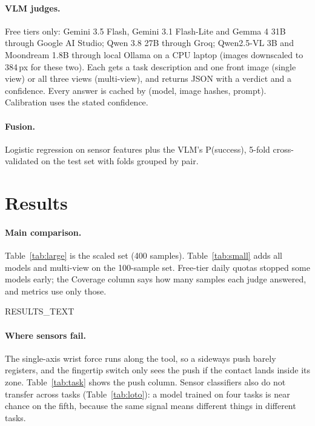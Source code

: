 \documentclass[10pt,twocolumn]{article}
\begin{document}
\paragraph{VLM judges.} Free tiers only: Gemini 3.5 Flash, Gemini 3.1 Flash-Lite and Gemma 4 31B through Google AI Studio; Qwen 3.8 27B through Groq; Qwen2.5-VL 3B and Moondream 1.8B through local Ollama on a CPU laptop (images downscaled to 384\,px for these two). Each gets a task description and one front image (single view) or all three views (multi-view), and returns JSON with a verdict and a confidence. Every answer is cached by (model, image hashes, prompt). Calibration uses the stated confidence.
\paragraph{Fusion.} Logistic regression on sensor features plus the VLM's P(success), 5-fold cross-validated on the test set with folds grouped by pair.

\section{Results}
\paragraph{Main comparison.} Table~\ref{tab:large} is the scaled set (400 samples). Table~\ref{tab:small} adds all models and multi-view on the 100-sample set. Free-tier daily quotas stopped some models early; the Coverage column says how many samples each judge answered, and metrics use only those.
\begin{table}[t]\centering\small\caption{Scaled set (400 samples). Sorted by balanced accuracy.}\label{tab:large}\end{table}
\begin{table}[t]\centering\small\caption{Small set (100 samples), all judges including multi-view. Partial coverage reflects free-tier quotas.}\label{tab:small}\end{table}
\begin{table}[t]\centering\small\resizebox{\columnwidth}{!}{}\caption{Balanced accuracy by task, scaled set.}\label{tab:task}\end{table}
RESULTS\_TEXT

\paragraph{Where sensors fail.} The single-axis wrist force runs along the tool, so a sideways push barely registers, and the fingertip switch only sees the push if the contact lands inside its zone. Table~\ref{tab:task} shows the push column. Sensor classifiers also do not transfer across tasks (Table~\ref{tab:loto}): a model trained on four tasks is near chance on the fifth, because the same signal means different things in different tasks.
\begin{table}[t]\centering\small\caption{Sensor classifier trained on four tasks, tested on the held-out one.}\label{tab:loto}\end{table}
\end{document}
